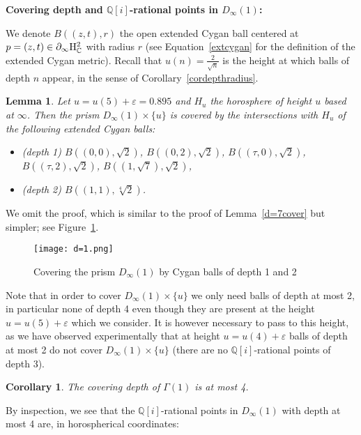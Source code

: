 \documentclass{article}[12pt]
\newcommand{\C}{\mathbb{C}}
\newcommand{\Q}{\mathbb{Q}}
\newtheorem{cor}{Corollary}
\newtheorem{lem}{Lemma}%
\begin{document}
{\bf Covering depth and $\Q[i]$-rational points in $D_\infty(1)$:}

We denote $B\left((z,t),r\right)$ the open extended Cygan ball centered at $p=(z,t) \in \partial_\infty {\rm H}_\C^2$ with radius $r$ (see Equation~\ref{extcygan} for the definition of the extended Cygan metric). Recall that $u(n)=\frac{2}{\sqrt{n}}$ is the height at which balls of depth $n$ appear, in the sense of Corollary~\ref{cordepthradius}. 

\begin{lem}\label{d=1cover} Let $u=u(5)+\varepsilon=0.895$ and $H_u$ the horosphere of height $u$ based at $\infty$. Then the prism $D_\infty(1)\times \{ u \}$ is covered by the intersections with $H_u$ of the following extended Cygan balls:
  \begin{itemize}
\item (depth 1)  $B\left((0,0),\sqrt{2}\right)$, $B\left((0,2),\sqrt{2}\right)$, $B\left((\tau,0),\sqrt{2}\right)$, $B\left((\tau,2),\sqrt{2}\right)$, $B\left((1,\sqrt{7}),\sqrt{2}\right)$,
\item (depth 2) $B\left((1,1),\sqrt[4]{2}\right)$.

  \end{itemize}
\end{lem}

  We omit the proof, which is similar to the proof of Lemma~\ref{d=7cover} but simpler; see Figure~\ref{d=1pic}.

\begin{center}
\begin{figure}\label{d=1pic}
\caption{Covering the prism $D_\infty (1)$ by Cygan balls of depth 1 and 2}
\texttt{[image: d=1.png]}
\end{figure}
  \end{center}
 
  Note that in order to cover  $D_\infty(1)\times \{ u \}$ we only need balls of depth at most 2, in particular none of depth 4 even though they are present at the height $u=u(5)+\varepsilon$ which we consider. It is however necessary to pass to this height, as we have observed experimentally that at height $u=u(4)+\varepsilon$ balls of depth at most 2 do not cover $D_\infty(1)\times \{ u \}$ (there are no $\Q[i]$-rational points of depth 3).
  

\begin{cor} The covering depth of $\Gamma(1)$ is at most 4.
\end{cor}

By inspection, we see that the $\Q[i]$-rational points in $D_\infty(1)$ with depth at most 4 are, in horospherical coordinates:
\end{document}
